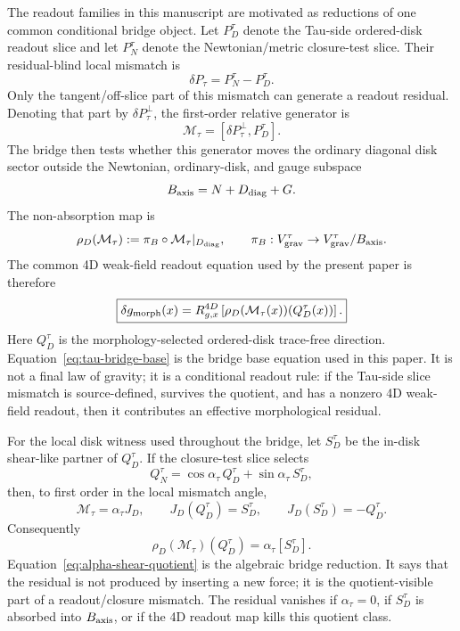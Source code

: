 \documentclass[11pt]{article}
\begin{document}
The readout families in this manuscript are motivated as reductions of one
common conditional bridge object.  Let \(P_D^\tau\) denote the Tau-side
ordered-disk readout slice and let \(P_N^\tau\) denote the Newtonian/metric
closure-test slice.  Their residual-blind local mismatch is
\[
\delta P_\tau = P_N^\tau-P_D^\tau .
\]
Only the tangent/off-slice part of this mismatch can generate a readout
residual.  Denoting that part by \(\delta P_\tau^\perp\), the first-order
relative generator is
\[
\mathcal M_\tau=[\delta P_\tau^\perp,P_D^\tau] .
\]
The bridge then tests whether this generator moves the ordinary diagonal disk
sector outside the Newtonian, ordinary-disk, and gauge subspace
\[
B_{\rm axis}=N+D_{\rm diag}+G .
\]
The non-absorption map is
\[
\rho_D(\mathcal M_\tau)
 :=
\pi_B\circ \mathcal M_\tau|_{D_{\rm diag}},
\qquad
\pi_B:V_{\rm grav}^\tau\to V_{\rm grav}^\tau/B_{\rm axis}.
\]
The common 4D weak-field readout equation used by the present paper is therefore
\begin{equation}
\boxed{
\delta g_{\rm morph}(x)
=
R^{4D}_{g,x}
\left[
\rho_D(\mathcal M_\tau(x))(Q_D^\tau(x))
\right].
}
\label{eq:tau-bridge-base}
\end{equation}
Here \(Q_D^\tau\) is the morphology-selected ordered-disk trace-free direction.
Equation~\eqref{eq:tau-bridge-base} is the bridge base equation used in this
paper.  It is not a final law of gravity; it is a conditional readout rule:
if the Tau-side slice mismatch is source-defined, survives the quotient, and
has a nonzero 4D weak-field readout, then it contributes an effective
morphological residual.

For the local disk witness used throughout the bridge, let \(S_D^\tau\) be the
in-disk shear-like partner of \(Q_D^\tau\).  If the closure-test slice selects
\[
Q_N^\tau
=
\cos\alpha_\tau\,Q_D^\tau
+
\sin\alpha_\tau\,S_D^\tau ,
\]
then, to first order in the local mismatch angle,
\[
\mathcal M_\tau=\alpha_\tau J_D,
\qquad
J_D(Q_D^\tau)=S_D^\tau,
\qquad
J_D(S_D^\tau)=-Q_D^\tau .
\]
Consequently
\begin{equation}
\rho_D(\mathcal M_\tau)(Q_D^\tau)
=
\alpha_\tau [S_D^\tau].
\label{eq:alpha-shear-quotient}
\end{equation}
Equation~\eqref{eq:alpha-shear-quotient} is the algebraic bridge reduction.
It says that the residual is not produced by inserting a new force; it is the
quotient-visible part of a readout/closure mismatch.  The residual vanishes if
\(\alpha_\tau=0\), if \(S_D^\tau\) is absorbed into \(B_{\rm axis}\), or if the
4D readout map kills this quotient class.
\end{document}

